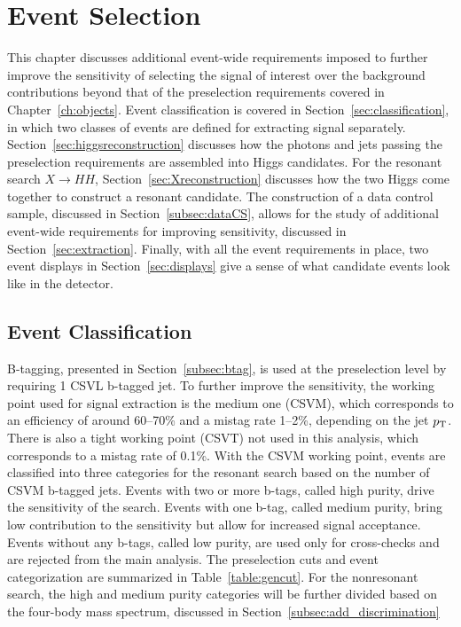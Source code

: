 \chapter{Event Selection\label{ch:selection}}

This chapter discusses additional event-wide requirements imposed to further
improve the sensitivity of selecting the signal of interest over the background contributions
beyond that of the preselection requirements covered in Chapter~\ref{ch:objects}.
Event classification is covered in Section~\ref{sec:classification}, in which two classes of
events are defined for extracting signal separately.
Section~\ref{sec:higgsreconstruction} discusses how the photons and jets passing the preselection
requirements are assembled into Higgs candidates. For the resonant search $X\rightarrow HH$,
Section~\ref{sec:Xreconstruction} discusses how the two Higgs come together to construct a resonant
candidate. The construction of a data control
sample, discussed in Section~\ref{subsec:dataCS}, allows for the study of additional event-wide
requirements for improving sensitivity, discussed in Section~\ref{sec:extraction}.
Finally, with all the event requirements in place, two event displays in Section~\ref{sec:displays}
give a sense of what candidate events look like in the detector.

\section{Event Classification\label{sec:classification}}

B-tagging, presented in Section~\ref{subsec:btag}, is used at the preselection level by
requiring 1 CSVL b-tagged jet. To further improve the sensitivity, the working point used for
signal extraction is the medium one (CSVM), which corresponds to an efficiency of around 60--70\%
and a mistag rate 1--2\%, depending on the jet $p_{\rm T}$.
There is also a tight working point (CSVT) not used in this analysis,
which corresponds to a mistag rate of 0.1\%.
With the CSVM working point, events are classified into three categories for the resonant search
based on the number of CSVM b-tagged jets. Events with two or more b-tags, called high purity,
drive the sensitivity of the search. Events with one b-tag, called medium purity,
bring low contribution to the sensitivity
but allow for increased signal acceptance. Events without any b-tags,
called low purity, are used only for cross-checks and are rejected from the main analysis.
The preselection cuts and event categorization
are summarized in Table~\ref{table:gencut}.
For the nonresonant search, the high and medium purity categories will be further divided based
on the four-body mass spectrum, discussed in Section~\ref{subsec:add_discrimination}


